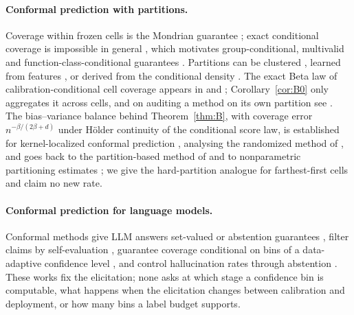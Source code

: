 \documentclass[twoside]{article}
\theoremstyle{definition}
\theoremstyle{remark}
\newcommand{\1}{\mathbf{1}}
\begin{document}
\paragraph{Conformal prediction with partitions.} Coverage within frozen cells is the Mondrian
guarantee \citep{vovk2005algorithmic,vovk2012conditional}; exact conditional coverage is impossible in
general \citep{barber2021limits}, which motivates group-conditional, multivalid and
function-class-conditional guarantees \citep{jung2023batch,bastani2022practical,gibbs2023conformal}.
Partitions can be clustered \citep{ding2023class}, learned from features
\citep{kiyani2024conformal}, or derived from the conditional density \citep{izbicki2022cdsplit}. The
exact Beta law of calibration-conditional cell coverage appears in \citet{vovk2012conditional} and
\citet{ding2023class}; Corollary~\ref{cor:B0} only aggregates it across cells, and on auditing a
method on its own partition see \citet{berthier2026self}. The bias--variance balance behind
Theorem~\ref{thm:B}, with coverage error $n^{-\beta/(2\beta+d)}$ under H\"older continuity of the
conditional score law, is established for kernel-localized conformal prediction
\citep{conrad2026beyond,min2026unified}, analysing the randomized method of \citet{hore2025conformal}, and goes back to the partition-based method
of \citet{lei2014distribution} and to nonparametric partitioning estimates \citep{gyorfi2002distribution};
we give the hard-partition analogue for farthest-first cells \citep{gonzalez1985clustering,dasgupta2005performance}
and claim no new rate.

\paragraph{Conformal prediction for language models.} Conformal methods give LLM answers set-valued or
abstention guarantees \citep{kumar2023conformal,quach2024conformal}, filter claims by self-evaluation
\citep{mohri2024language}, guarantee coverage conditional on bins of a data-adaptive confidence level
\citep{cherian2024large}, and control hallucination rates through abstention
\citep{abbasiyadkori2024mitigating}. These works fix the elicitation; none asks at which stage a
confidence bin is computable, what happens when the elicitation changes between calibration and
deployment, or how many bins a label budget supports.
\end{document}
